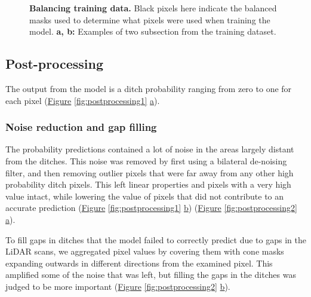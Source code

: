 \documentclass[11pt, review]{elsarticle} %
\begin{document}
\begin{figure} [!htb]
    \caption{\textbf{Balancing training data.} Black pixels here indicate the balanced masks used to determine what pixels were used when training the model. \textbf{a, b: }Examples of two subsection from the training dataset.}
    \label{fig:balancedmasks}
\end{figure}

\newpage
\subsection{Post-processing}

The output from the model is a ditch probability ranging from zero to one for each pixel (\hyperref[fig:postprocessing1]{Figure} \ref{fig:postprocessing1} \hyperref[fig:postprocessing1]{a}).

\subsubsection{Noise reduction and gap filling}

The probability predictions contained a lot of noise in the areas largely distant from the ditches. This noise was removed by first using a bilateral de-noising filter, and then removing outlier pixels that were far away from any other high probability ditch pixels. This left linear properties and pixels with a very high value intact, while lowering the value of pixels that did not contribute to an accurate prediction (\hyperref[fig:postprocessing1]{Figure} \ref{fig:postprocessing1} \hyperref[fig:postprocessing1]{b}) (\hyperref[fig:postprocessing2]{Figure} \ref{fig:postprocessing2} \hyperref[fig:postprocessing2]{a}).

To fill gaps in ditches that the model failed to correctly predict due to gaps in the LiDAR scans, we aggregated pixel values by covering them with cone masks expanding outwards in different directions from the examined pixel. This amplified some of the noise that was left, but filling the gaps in the ditches was judged to be more important (\hyperref[fig:postprocessing2]{Figure} \ref{fig:postprocessing2} \hyperref[fig:postprocessing2]{b}).
\end{document}
